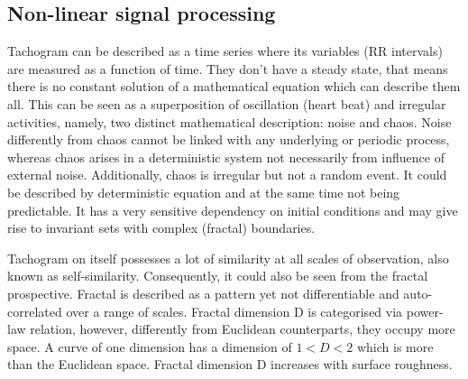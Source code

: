 \subsection{Non-linear signal processing}

Tachogram can be described as a time series where its variables (RR intervals) are measured as a function of time. They don't have a steady state, that means there is no constant solution of a mathematical equation which can describe them all. This can be seen as a superposition of oscillation (heart beat) and irregular activities, namely, two distinct mathematical description: noise and chaos. Noise differently from chaos cannot be linked with any underlying or periodic process, whereas chaos arises in a deterministic system not necessarily from influence of external noise. Additionally, chaos is irregular but not a random event. It could be described by deterministic equation and at the same time not being predictable. It has a very sensitive dependency on initial conditions and may give rise to invariant sets with complex (fractal) boundaries.   

Tachogram on itself possesses a lot of similarity at all scales of observation, also known as self-similarity. Consequently, it could also be seen from the fractal prospective. Fractal is described as a pattern yet not differentiable and auto-correlated over a range of scales. Fractal dimension D is categorised via power-law relation, however, differently from Euclidean counterparts, they occupy more space. A curve of one dimension has a dimension of $1<D<2$ which is more than the Euclidean space. Fractal dimension D increases with surface roughness. 


